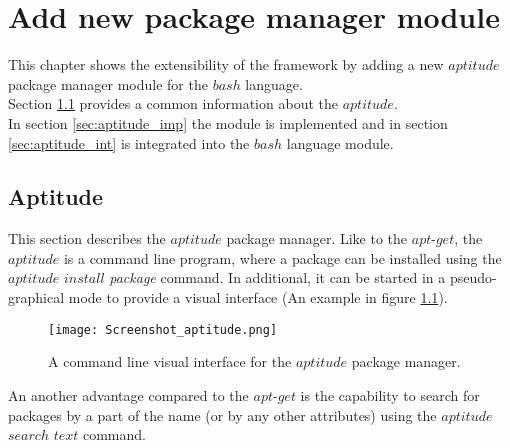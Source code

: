 
\chapter{Add new package manager module}\label{chap:add}
This chapter shows the extensibility of the framework by adding a new $aptitude$ package manager module for the $bash$ language.\\
Section \ref{sec:aptitude} provides a common information about the $aptitude$.\\
In section \ref{sec:aptitude_imp} the module is implemented and in section \ref{sec:aptitude_int} is integrated into the $bash$ language module.

\section{Aptitude}\label{sec:aptitude}
This section describes the $aptitude$ package manager.
Like to the $apt$-$get$, the $aptitude$ is a command line program, where a package can be installed using the $aptitude$ $install$ \emph{package} command. 
In additional, it can be started in a pseudo-graphical mode to provide a visual interface (An example in figure \ref{fig:aptitude_gui}).
\begin{figure}[ht]   
	\centering
	\texttt{[image: Screenshot\_aptitude.png]}
	\caption{A command line visual interface for the $aptitude$ package manager.}
	\label{fig:aptitude_gui}
\end{figure}
An another advantage compared to the $apt$-$get$ is the capability to search for packages by a part of the name (or by any other attributes) using the $aptitude$ $search$ $text$ command.
